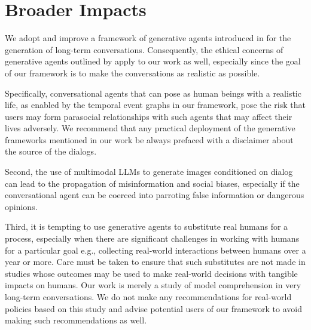 \section{Broader Impacts}
We adopt and improve a framework of generative agents introduced in \citet{park2023generative} for the generation of long-term conversations. Consequently, the ethical concerns of generative agents outlined by \citet{park2023generative} apply to our work as well, especially since the goal of our framework is to make the conversations as realistic as possible. 


Specifically, conversational agents that can pose as human beings with a realistic life, as enabled by the temporal event graphs in our framework, pose the risk that users may form parasocial relationships with such agents that may affect their lives adversely. We recommend that any practical deployment of the generative frameworks mentioned in our work be always prefaced with a disclaimer about the source of the dialogs.


Second, the use of multimodal LLMs \cite{zheng2023minigpt} to generate images conditioned on dialog can lead to the propagation of misinformation and social biases, especially if the conversational agent can be coerced into parroting false information or dangerous opinions.

Third, it is tempting to use generative agents to substitute real humans for a process, especially when there are significant challenges in working with humans for a particular goal e.g., collecting real-world interactions between humans over a year or more. Care must be taken to ensure that such substitutes are not made in studies whose outcomes may be used to make real-world decisions with tangible impacts on humans. Our work is merely a study of model comprehension in very long-term conversations. We do not make any recommendations for real-world policies based on this study and advise potential users of our framework to avoid making such recommendations as well.
